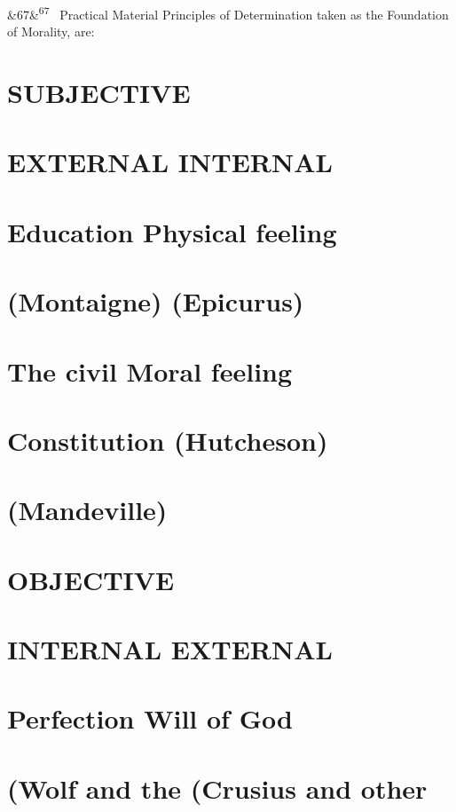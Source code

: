 \documentclass[12pt]{article}
\newcommand{\para}[1][]{\par\noindent\ifx&#1&\else\textsuperscript{\footnotesize #1}~\fi}
\begin{document}
\para[67] Practical Material Principles of Determination taken as the Foundation of Morality, are:

\section*{SUBJECTIVE}

\section*{EXTERNAL INTERNAL}

\section*{Education Physical feeling}

\section*{(Montaigne) (Epicurus)}

\section*{The civil Moral feeling}

\section*{Constitution (Hutcheson)}

\section*{(Mandeville)}

\section*{OBJECTIVE}

\section*{INTERNAL EXTERNAL}

\section*{Perfection Will of God}

\section*{(Wolf and the (Crusius and other}
\end{document}
